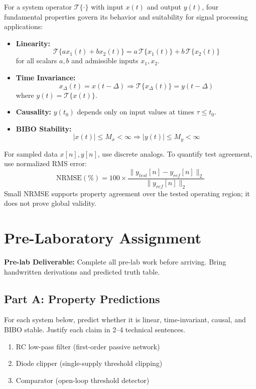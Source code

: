 \documentclass[11pt,letterpaper]{article}
\providecommand{\pldECE}[1]{\textcolor{BrickRed}{\textbf{Pre-lab Deliverable:} #1}}
\begin{document}
For a system operator $\mathcal{T}\{\cdot\}$ with input $x(t)$ and output $y(t)$, four fundamental properties govern its behavior and suitability for signal processing applications:
\begin{itemize}
    \item \textbf{Linearity:}
    \[
    \mathcal{T}\{a x_1(t) + b x_2(t)\} = a\,\mathcal{T}\{x_1(t)\} + b\,\mathcal{T}\{x_2(t)\}
    \]
    for all scalars $a,b$ and admissible inputs $x_1, x_2$.

    \item \textbf{Time Invariance:}
    \[
    x_\Delta(t)=x(t-\Delta) \Rightarrow \mathcal{T}\{x_\Delta(t)\}=y(t-\Delta)
    \]
    where $y(t)=\mathcal{T}\{x(t)\}$.

    \item \textbf{Causality:} $y(t_0)$ depends only on input values at times $\tau\le t_0$.

    \item \textbf{BIBO Stability:}
    \[
    |x(t)|\le M_x<\infty \Rightarrow |y(t)|\le M_y<\infty
    \]
\end{itemize}

For sampled data $x[n],y[n]$, use discrete analogs. To quantify test agreement, use normalized RMS error:
\[
\mathrm{NRMSE}(\%) = 100\times\frac{\|y_{test}[n]-y_{ref}[n]\|_2}{\|y_{ref}[n]\|_2}
\]
Small NRMSE supports property agreement over the tested operating region; it does not prove global validity.

\clearpage

\section{Pre-Laboratory Assignment}

\pldECE{Complete all pre-lab work before arriving. Bring handwritten derivations and predicted truth table.}

\subsection{Part A: Property Predictions}
For each system below, predict whether it is linear, time-invariant, causal, and BIBO stable. Justify each claim in 2--4 technical sentences.
\begin{enumerate}
    \item RC low-pass filter (first-order passive network)
    \item Diode clipper (single-supply threshold clipping)
    \item Comparator (open-loop threshold detector)
\end{enumerate}
\end{document}

